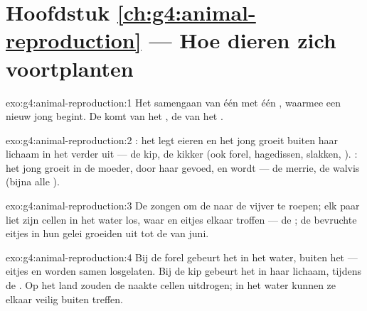 \section*{Hoofdstuk \ref{ch:g4:animal-reproduction} --- Hoe dieren zich voortplanten}

\begin{solution}{exo:g4:animal-reproduction:1}
Het samengaan van één  met één , waarmee een nieuw jong
 begint. De  komt van het , de  van het .
\end{solution}

\begin{solution}{exo:g4:animal-reproduction:2}
: het  legt eieren en het jong groeit buiten haar
lichaam in het  verder uit --- de kip, de kikker (ook forel,
hagedissen, slakken, ). : het jong groeit in de
moeder, door haar gevoed, en wordt  --- de merrie, de
walvis (bijna alle ).
\end{solution}

\begin{solution}{exo:g4:animal-reproduction:3}
De  zongen om de  naar de vijver te roepen; elk paar
liet zijn cellen in het water los, waar  en eitjes elkaar troffen
--- de ; de bevruchte eitjes in hun gelei groeiden uit tot
de  van juni.
\end{solution}

\begin{solution}{exo:g4:animal-reproduction:4}
Bij de forel gebeurt het in het water, buiten het  --- eitjes
en  worden samen losgelaten. Bij de kip gebeurt het in haar
lichaam, tijdens de . Op het land zouden de naakte cellen
uitdrogen; in het water kunnen ze elkaar veilig buiten treffen.
\end{solution}


